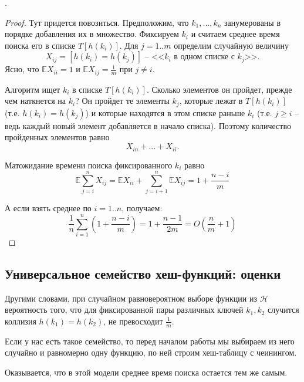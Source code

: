 .
\begin{proof}
Тут придется повозиться. Предположим, что $k_1, ..., k_n$ занумерованы в порядке добавления их в множество. Фиксируем $k_i$ и считаем среднее время поиска его в списке $T[h(k_i)]$. Для $j=1..m$ определим случайную величину $$X_{ij} = [h(k_i) = h(k_j)] \text{ -- <<$k_i$ в одном списке с $k_j$>>.}$$ Ясно, что $\mathbb E X_{ii} = 1$ и $\mathbb E X_{ij} = \frac{1}{m}$ при $j\neq i$. 

Алгоритм ищет $k_i$ в списке $T[h(k_i)]$. Сколько элементов он пройдет, прежде чем наткнется на $k_i$? Он пройдет те элементы $k_j$, которые лежат в $T[h(k_i)]$ (т.е. $h(k_i)=h(k_j)$) и которые находятся в этом списке раньше $k_i$ (т.е. $j\geq i$ -- ведь каждый новый элемент добавляется в начало списка). Поэтому количество пройденных элементов равно $$X_{in} + ... + X_{ii}.$$

Матожидание времени поиска фиксированного $k_i$ равно $$\mathbb E \sum_{j=i}^n X_{ij} = \mathbb E X_{ii} + \sum_{j=i+1}^n \mathbb E X_{ij} = 1 + \frac{n-i}{m}$$

А если взять среднее по $i=1..n$, получаем: $$\frac{1}{n} \sum_{i=1}^n(1+\frac{n-i}{m}) = 1 + \frac{n-1}{2m} = O(\frac{n}{m} + 1) $$ \end{proof}

\subsection{Универсальное семейство хеш-функций: оценки}


 Другими словами, при случайном равновероятном выборе функции из $\mathcal{H}$ вероятность того, что для фиксированной пары различных ключей $k_1, k_2$ случится коллизия $h(k_1) = h(k_2)$, не превосходит $\frac{1}{m}$.

Если у нас есть такое семейство, то перед началом работы мы выбираем из него случайно и равномерно одну функцию, по ней строим хеш-таблицу с чеинингом.

Оказывается, что в этой модели среднее время поиска остается тем же самым.

